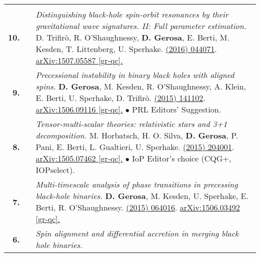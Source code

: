 {\begin{longtable}{rp{0.3cm}p{15.8cm}}
\vspace{0.09cm}\\
%
\textbf{10.} & & \textit{Distinguishing black-hole spin-orbit resonances by their gravitational wave signatures. II: Full parameter estimation.}
\newline{}
D. Trifir\`o, R. O'Shaughnessy, \textbf{D. Gerosa}, E. Berti, M. Kesden, T. Littenberg, U. Sperhake.
\newline{}
\href{http://dx.doi.org/10.1103/PhysRevD.93.044071}{\prd 93 (2016) 044071}. \href{https://arxiv.org/abs/1507.05587}{arXiv:1507.05587 [gr-qc].}
\vspace{0.09cm}\\
%
\textbf{9.} & & \textit{Precessional instability in binary black holes with aligned spins.}
\newline{}
\textbf{D. Gerosa}, M. Kesden, R. O'Shaughnessy, A. Klein, E. Berti, U. Sperhake, D. Trifir\`o.
\newline{}
\href{http://dx.doi.org/10.1103/PhysRevLett.115.141102}{\prl 115 (2015) 141102}. \href{https://arxiv.org/abs/1506.09116}{arXiv:1506.09116 [gr-qc].}
\newline{}
\textcolor{color1}{$\bullet$} PRL Editors' Suggestion.
\vspace{0.09cm}\\
%
\textbf{8.} & & \textit{Tensor-multi-scalar theories: relativistic stars and 3+1 decomposition.}
\newline{}
M. Horbatsch, H. O. Silva, \textbf{D. Gerosa}, P. Pani,  E. Berti, L. Gualtieri, U. Sperhake.
\newline{}
\href{http://dx.doi.org/10.1088/0264-9381/32/20/204001}{\cqg 32 (2015) 204001}. \href{https://arxiv.org/abs/1505.07462}{arXiv:1505.07462 [gr-qc].}
\newline{}
\textcolor{color1}{$\bullet$} IoP Editor's choice (CQG+, IOPselect).
\vspace{0.09cm}\\
%
\textbf{7.} & & \textit{Multi-timescale analysis of phase transitions in precessing black-hole binaries.}
\newline{}
\textbf{D. Gerosa}, M. Kesden, U. Sperhake, E. Berti, R. O'Shaughnessy.
\newline{}
\href{http://dx.doi.org/10.1103/PhysRevD.92.064016}{\prd 92 (2015) 064016}. \href{https://arxiv.org/abs/1506.03492}{arXiv:1506.03492 [gr-qc].}
\vspace{0.09cm}\\
%
\textbf{6.} & & \textit{Spin alignment and differential accretion in merging black hole binaries.}

\end{longtable}}
